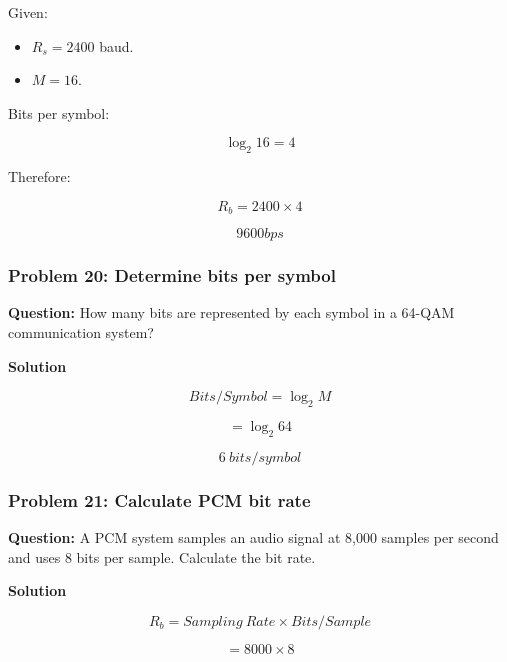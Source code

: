 Given:

\begin{itemize}
\item $R_s=2400$ baud.
\item $M=16$.
\end{itemize}

Bits per symbol:



\[
\log_2 16=4
\]



Therefore:



\[
R_b=2400\times4
\]





\[
\boxed{9600bps}
\]



\subsubsection*{Problem 20: Determine bits per symbol}

\textbf{Question:} How many bits are represented by each symbol in a 64-QAM communication system?

\textbf{Solution}



\[
Bits/Symbol=\log_2M
\]





\[
=\log_2 64
\]





\[
\boxed{6\ bits/symbol}
\]



\subsubsection*{Problem 21: Calculate PCM bit rate}

\textbf{Question:} A PCM system samples an audio signal at 8,000 samples per second and uses 8 bits per sample. Calculate the bit rate.

\textbf{Solution}



\[
R_b=Sampling\ Rate\times Bits/Sample
\]





\[
=8000\times8
\]





